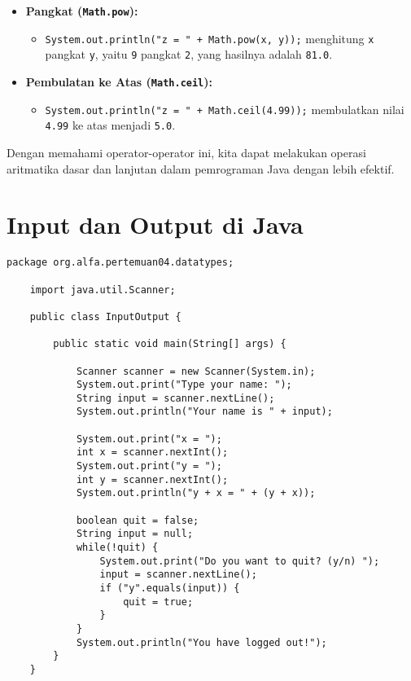 \begin{itemize}
	\item \textbf{Pangkat (\texttt{Math.pow}):}
	\begin{itemize}
		\item \texttt{System.out.println("z = " + Math.pow(x, y));} menghitung \texttt{x} pangkat \texttt{y}, yaitu \texttt{9} pangkat \texttt{2}, yang hasilnya adalah \texttt{81.0}.
	\end{itemize}
	
	\item \textbf{Pembulatan ke Atas (\texttt{Math.ceil}):}
	\begin{itemize}
		\item \texttt{System.out.println("z = " + Math.ceil(4.99));} membulatkan nilai \texttt{4.99} ke atas menjadi \texttt{5.0}.
	\end{itemize}
	
\end{itemize}

Dengan memahami operator-operator ini, kita dapat melakukan operasi aritmatika dasar dan lanjutan dalam pemrograman Java dengan lebih efektif.

\section{Input dan Output di Java}

\begin{lstlisting}[style=JavaStyle, caption={Java Code for Input and Output Operations}]
	package org.alfa.pertemuan04.datatypes;
	
	import java.util.Scanner;
	
	public class InputOutput {
		
		public static void main(String[] args) {
			
			Scanner scanner = new Scanner(System.in);
			System.out.print("Type your name: ");
			String input = scanner.nextLine();
			System.out.println("Your name is " + input);
			
			System.out.print("x = ");
			int x = scanner.nextInt();
			System.out.print("y = ");
			int y = scanner.nextInt();
			System.out.println("y + x = " + (y + x));
			
			boolean quit = false;
			String input = null;
			while(!quit) {
				System.out.print("Do you want to quit? (y/n) ");
				input = scanner.nextLine();
				if ("y".equals(input)) {
					quit = true;
				}
			}
			System.out.println("You have logged out!");
		}
	}
\end{lstlisting}

